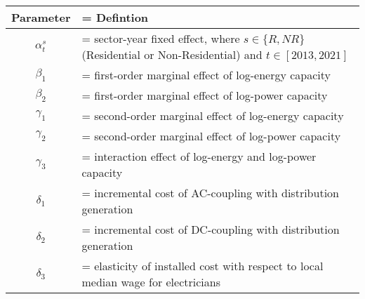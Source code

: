 \renewcommand\tabularxcolumn[1]{m{#1}}

\begin{tabularx}{\textwidth}{c>{\hsize=1.0\hsize\linewidth=\hsize}X}
\hline
\Tstrut Parameter & Defintion                             \\ \hline
\Tstrut $\alpha^{s}_{t}$       & sector-year fixed effect, where $s \in \{R,NR\}$ (Residential or Non-Residential) and $t \in [2013, 2021]$   \\ \hline
$\beta_1$               & first-order marginal effect of log-energy capacity              \\ \hline
$\beta_2$               & first-order marginal effect of log-power capacity               \\ \hline
$\gamma_1$              & second-order marginal effect of log-energy capacity      \\ \hline
$\gamma_2$               & second-order marginal effect of log-power capacity      \\ \hline 
$\gamma_3$             & interaction effect of log-energy and log-power capacity   \\ \hline
$\delta_1$             & incremental cost of AC-coupling with distribution generation \\ \hline
$\delta_2$             & incremental cost of DC-coupling with distribution generation  \\ \hline
$\delta_3$             & elasticity of installed cost with respect to local median wage for electricians \\ \hline
\end{tabularx}
